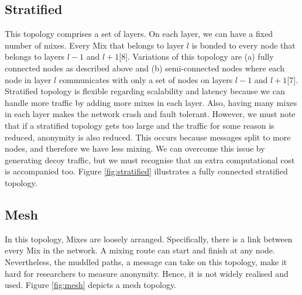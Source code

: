 \documentclass[logo,msc,cyber]{infthesis}   %
\begin{document}
\subsection{Stratified}
This topology comprises a set of layers. On each layer, we can have a fixed
number of mixes. Every Mix that belongs to layer $l$ is bonded to every node
that belongs to layers $l-1$ and $l+1$[8]. Variations of this topology are (a)
fully connected nodes as described above and (b) semi-connected nodes where each
node in layer $l$ communicates with only a set of nodes on layers $l-1$ and
$l+1$[7]. Stratified topology is flexible regarding scalability and latency
because we can handle more traffic by adding more mixes in each layer. Also,
having many mixes in each layer makes the network crash and fault tolerant.
However, we must note that if a stratified topology gets too large and the
traffic for some reason is reduced, anonymity is also reduced. This occurs
because messages split to more nodes, and therefore we have less mixing. We can
overcome this issue by generating decoy traffic, but we must recognise that an
extra computational cost is accompanied too. Figure \ref{fig:stratified} illustrates a fully
connected stratified topology.

\subsection{Mesh}
In this topology, Mixes are loosely arranged. Specifically, there is a link
between every Mix in the network. A mixing route can start and finish at any
node. Nevertheless, the muddled paths, a message can take on this topology, make
it hard for researchers to measure anonymity. Hence, it is not widely realised
and used. Figure \ref{fig:mesh} depicts a mesh topology.
\end{document}
